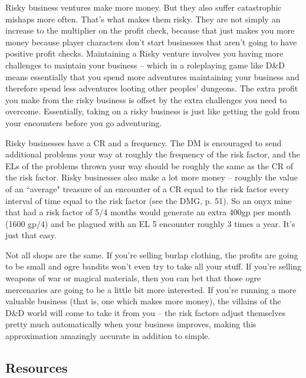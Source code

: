 Risky business ventures make more money. But they also suffer catastrophic mishaps more often. That's what makes them risky. They are not simply an increase to the multiplier on the profit check, because that just makes you more money because player characters don't start businesses that aren't going to have positive profit checks. Maintaining a Risky venture involves you having more challenges to maintain your business -- which in a roleplaying game like D\&D means essentially that you spend more adventures maintaining your business and therefore spend less adventures looting other peoples' dungeons. The extra profit you make from the risky business is offset by the extra challenges you need to overcome. Essentially, taking on a risky business is just like getting the gold from your encounters before you go adventuring.

Risky businesses have a CR and a frequency. The DM is encouraged to send additional problems your way at roughly the frequency of the risk factor, and the ELs of the problems thrown your way should be roughly the same as the CR of the risk factor. Risky businesses also make a lot more money -- roughly the value of an ``average" treasure of an encounter of a CR equal to the risk factor every interval of time equal to the risk factor (see the DMG, p. 51). So an onyx mine that had a risk factor of 5/4 months would generate an extra 400gp per month (1600 gp/4) and be plagued with an EL 5 encounter roughly 3 times a year. It's just that easy.

Not all shops are the same. If you're selling burlap clothing, the profits are going to be small and ogre bandits won't even try to take all your stuff. If you're selling weapons of war or magical materials, then you can bet that those ogre mercenaries are going to be a little bit more interested. If you're running a more valuable business (that is, one which makes more money), the villains of the D\&D world will come to take it from you -- the risk factors adjust themselves pretty much automatically when your business improves, making this approximation amazingly accurate in addition to simple.

\subsection{Resources}

